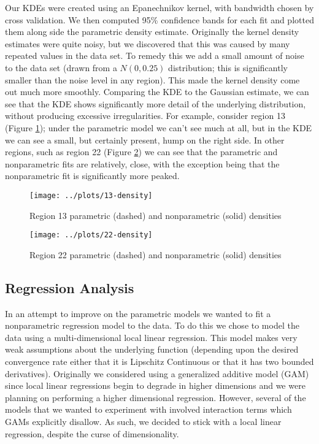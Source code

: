 \documentclass[12pt]{article}
\begin{document}
Our KDEs were created using an Epanechnikov kernel, with bandwidth chosen by cross validation. We then computed 95\% confidence bands for each fit and plotted them along side the parametric density estimate. Originally the kernel density estimates were quite noisy, but we discovered that this was caused by many repeated values in the data set. To remedy this we add a small amount of noise to the data set (drawn from a $N(0, 0.25)$ distribution; this is significantly smaller than the noise level in any region). This made the kernel density come out much more smoothly. Comparing the KDE to the Gaussian estimate, we can see that the KDE shows significantly more detail of the underlying distribution, without producing excessive irregularities. For example, consider region 13 (Figure \ref{region13density}); under the parametric model we can't see much at all, but in the KDE we can see a small, but certainly present, hump on the right side. In other regions, such as region 22 (Figure \ref{region22density}) we can see that the parametric and nonparametric fits are relatively, close, with the exception being that the nonparametric fit is significantly more peaked.
\begin{figure}[!ht]
\centering
\texttt{[image: ../plots/13-density]}
\caption{Region 13 parametric (dashed) and nonparametric (solid) densities}
\label{region13density}
\end{figure}
\begin{figure}[!ht]
\centering
\texttt{[image: ../plots/22-density]}
\caption{Region 22 parametric (dashed) and nonparametric (solid) densities}
\label{region22density}
\end{figure}
\subsection{Regression Analysis}
In an attempt to improve on the parametric models we wanted to fit a nonparametric regression model to the data. To do this we chose to model the data using a multi-dimensional local linear regression. This model makes very weak assumptions about the underlying function (depending upon the desired convergence rate either that it is Lipschitz Continuous or that it has two bounded derivatives). Originally we considered using a generalized additive model (GAM) since local linear regressions begin to degrade in higher dimensions and we were planning on performing a higher dimensional regression. However, several of the models that we wanted to experiment with involved interaction terms which GAMs explicitly disallow. As such, we decided to stick with a local linear regression, despite the curse of dimensionality.
\end{document}
